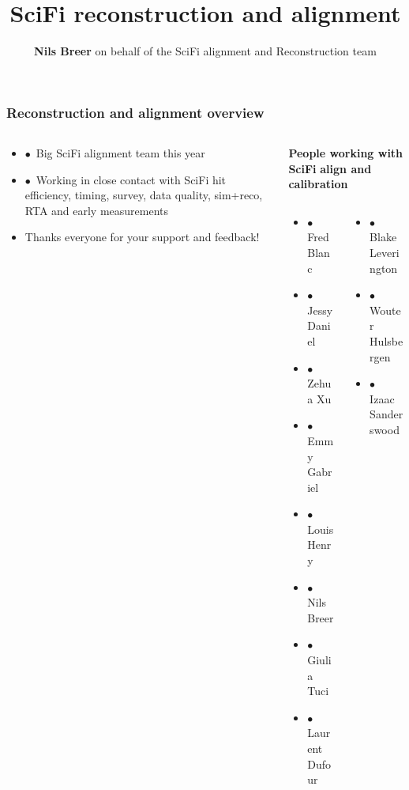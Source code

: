 \documentclass[aspectratio=1610, 12pt, xcolor=dvipsnames]{beamer}
\title{SciFi reconstruction and alignment}
\author[N.Breer]{\textbf{Nils Breer} on behalf of the SciFi alignment and Reconstruction team}
\institute{SciFi general at 108th LHCb week - 5th june 2023}
\date{}
\begin{document}
\maketitle

\begin{frame}\frametitle{Reconstruction and alignment overview}
  \begin{columns}
    \begin{column}[c]{0.4\textwidth}
      \begin{itemize}
        \item \large $\bullet$\, Big SciFi alignment team this year
        \item $\bullet$\, Working in close contact with SciFi hit efficiency, timing, survey, data quality, sim+reco, RTA and early measurements
        \item \large Thanks everyone for your support and feedback!
      \end{itemize}
    \end{column}
    \begin{column}[c]{0.6\textwidth}
      \textbf{People working with SciFi}
      \textbf{align and calibration}
      \begin{columns}
          \begin{column}[c]{0.45\textwidth}
            \begin{itemize}
              \item $\bullet$\, Fred Blanc
              \item $\bullet$\, Jessy Daniel
              \item $\bullet$\, Zehua Xu
              \item $\bullet$\, Emmy Gabriel
              \item $\bullet$\, Louis Henry
              \item $\bullet$\, Nils Breer
              \item $\bullet$\, Giulia Tuci
              \item $\bullet$\, Laurent Dufour
            \end{itemize}
          \end{column}
          \begin{column}[c]{0.55\textwidth}
            \begin{itemize}
              \item $\bullet$\, Blake Leverington
              \item $\bullet$\, Wouter Hulsbergen
              \item $\bullet$\, Izaac Sanderswood

\end{itemize}
\end{column}
\end{columns}
\end{column}
\end{columns}
\end{frame}
\end{document}
